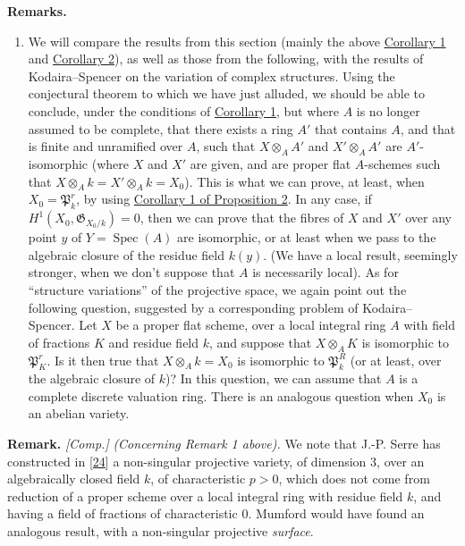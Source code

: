 \documentclass{article}
\providecommand{\tightlist}{%
  \setlength{\itemsep}{0pt}\setlength{\parskip}{0pt}}
\newenvironment{rmenv}[1]
  {\phantomsection\par\smallskip\noindent\textbf{#1.}\rmfamily}
  {\par\smallskip}
\theoremstyle{definition}
\theoremstyle{definition}
\theoremstyle{definition}
\theoremstyle{definition}
\theoremstyle{remark}
\begin{document}
\begin{rmenv}{Remarks}
\begin{enumerate}
\def\labelenumi{\arabic{enumi}.}
\setcounter{enumi}{2}
\tightlist
\item
  We will compare the results from this section (mainly the above \protect\hyperlink{fga-2-theorem-9-corollary-1}{Corollary 1} and \protect\hyperlink{fga-2-theorem-9-corollary-2}{Corollary 2}), as well as those from the following, with the results of Kodaira--Spencer on the variation of complex structures.
  Using the conjectural theorem to which we have just alluded, we should be able to conclude, under the conditions of \protect\hyperlink{fga-2-theorem-9-corollary-1}{Corollary 1}, but where \(A\) is no longer assumed to be complete, that there exists a ring \(A'\) that contains \(A\), and that is finite and unramified over \(A\), such that \(X\otimes_AA'\) and \(X'\otimes_AA'\) are \(A'\)-isomorphic (where \(X\) and \(X'\) are given, and are proper flat \(A\)-schemes such that \(X\otimes_Ak=X'\otimes_Ak=X_0\)).
  This is what we can prove, at least, when \(X_0={\mathfrak{P}}_k^r\), by using \protect\hyperlink{fga-2-proposition-2-corollary-1}{Corollary 1 of Proposition 2}.
  In any case, if \(H^1(X_0,{\mathfrak{G}}_{X_0/k})=0\), then we can prove that the fibres of \(X\) and \(X'\) over any point \(y\) of \(Y=\operatorname{Spec}(A)\) are isomorphic, or at least when we pass to the algebraic closure of the residue field \(k(y)\).
  (We have a local result, seemingly stronger, when we don't suppose that \(A\) is necessarily local).
  As for ``structure variations'' of the projective space, we again point out the following question, suggested by a corresponding problem of Kodaira--Spencer.
  Let \(X\) be a proper flat scheme, over a local integral ring \(A\) with field of fractions \(K\) and residue field \(k\), and suppose that \(X\otimes_AK\) is isomorphic to \({\mathfrak{P}}_K^r\).
  Is it then true that \(X\otimes_Ak=X_0\) is isomorphic to \({\mathfrak{P}}_k^R\) (or at least, over the algebraic closure of \(k\))?
  In this question, we can assume that \(A\) is a complete discrete valuation ring.
  There is an analogous question when \(X_0\) is an abelian variety.
\end{enumerate}

\end{rmenv}

\begin{rmenv}{Remark}
\emph{{[}Comp.{]}}
\emph{(Concerning Remark 1 above).}
We note that J.-P. Serre has constructed in {[}\protect\hyperlink{ref-Ser1961}{24}{]} a non-singular projective variety, of dimension \(3\), over an algebraically closed field \(k\), of characteristic \(p>0\), which does not come from reduction of a proper scheme over a local integral ring with residue field \(k\), and having a field of fractions of characteristic \(0\).
Mumford would have found an analogous result, with a non-singular projective \emph{surface}.

\end{rmenv}
\end{document}
